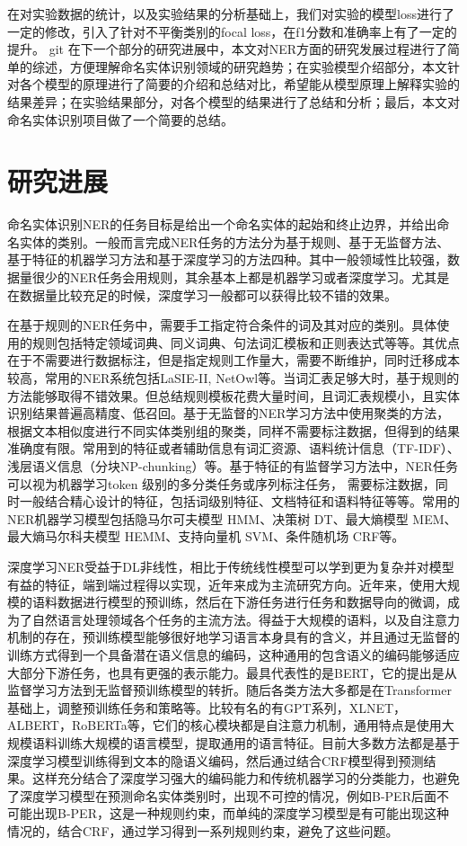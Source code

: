 \documentclass[a4paper, 12pt]{article}
\begin{document}
在对实验数据的统计，以及实验结果的分析基础上，我们对实验的模型loss进行了一定的修改，引入了针对不平衡类别的focal loss，在f1分数和准确率上有了一定的提升。
git
在下一个部分的研究进展中，本文对NER方面的研究发展过程进行了简单的综述，方便理解命名实体识别领域的研究趋势；在实验模型介绍部分，本文针对各个模型的原理进行了简要的介绍和总结对比，希望能从模型原理上解释实验的结果差异；在实验结果部分，对各个模型的结果进行了总结和分析；最后，本文对命名实体识别项目做了一个简要的总结。

\section{研究进展} %
\label{sec:progress}
命名实体识别NER的任务目标是给出一个命名实体的起始和终止边界，并给出命名实体的类别。一般而言完成NER任务的方法分为基于规则、基于无监督方法、基于特征的机器学习方法和基于深度学习的方法四种。其中一般领域性比较强，数据量很少的NER任务会用规则，其余基本上都是机器学习或者深度学习。尤其是在数据量比较充足的时候，深度学习一般都可以获得比较不错的效果\cite{lample-etal-2016-neural}。

在基于规则的NER任务中，需要手工指定符合条件的词及其对应的类别。具体使用的规则包括特定领域词典、同义词典、句法词汇模板和正则表达式等等。其优点在于不需要进行数据标注，但是指定规则工作量大，需要不断维护，同时迁移成本较高，常用的NER系统包括LaSIE-II, NetOwl等\cite{nadeau2007survey}。当词汇表足够大时，基于规则的方法能够取得不错效果。但总结规则模板花费大量时间，且词汇表规模小，且实体识别结果普遍高精度、低召回。基于无监督的NER学习方法中使用聚类的方法，根据文本相似度进行不同实体类别组的聚类，同样不需要标注数据，但得到的结果准确度有限。常用到的特征或者辅助信息有词汇资源、语料统计信息（TF-IDF）、浅层语义信息（分块NP-chunking）等\cite{rei-2017-semi}。基于特征的有监督学习方法中，NER任务可以视为机器学习token 级别的多分类任务或序列标注任务， 需要标注数据，同时一般结合精心设计的特征，包括词级别特征、文档特征和语料特征等等。常用的NER机器学习模型包括隐马尔可夫模型 HMM、决策树 DT、最大熵模型 MEM、最大熵马尔科夫模型 HEMM、支持向量机 SVM、条件随机场 CRF等。

深度学习NER受益于DL非线性，相比于传统线性模型可以学到更为复杂并对模型有益的特征，端到端过程得以实现，近年来成为主流研究方向。近年来，使用大规模的语料数据进行模型的预训练，然后在下游任务进行任务和数据导向的微调，成为了自然语言处理领域各个任务的主流方法。得益于大规模的语料，以及自注意力机制的存在，预训练模型能够很好地学习语言本身具有的含义，并且通过无监督的训练方式得到一个具备潜在语义信息的编码，这种通用的包含语义的编码能够适应大部分下游任务，也具有更强的表示能力\cite{9039685}。最具代表性的是BERT，它的提出是从监督学习方法到无监督预训练模型的转折。随后各类方法大多都是在Transformer基础上，调整预训练任务和策略等。比较有名的有GPT系列，XLNET，ALBERT，RoBERTa等，它们的核心模块都是自注意力机制，通用特点是使用大规模语料训练大规模的语言模型，提取通用的语言特征。目前大多数方法都是基于深度学习模型训练得到文本的隐语义编码，然后通过结合CRF模型得到预测结果。这样充分结合了深度学习强大的编码能力和传统机器学习的分类能力，也避免了深度学习模型在预测命名实体类别时，出现不可控的情况，例如B-PER后面不可能出现B-PER，这是一种规则约束，而单纯的深度学习模型是有可能出现这种情况的，结合CRF，通过学习得到一系列规则约束，避免了这些问题。
\end{document}
